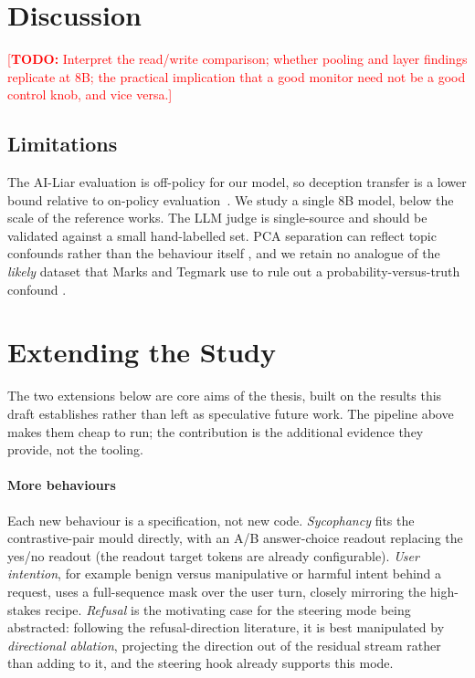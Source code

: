 \documentclass[conference]{IEEEtran}
\newcommand{\TODO}[1]{\textcolor{red}{[\textbf{TODO:} #1]}}
\begin{document}
\section{Discussion}
\TODO{Interpret the read/write comparison; whether pooling and layer findings
replicate at 8B; the practical implication that a good monitor need not be a
good control knob, and vice versa.}

\subsection{Limitations}
The AI-Liar evaluation is off-policy for our model, so deception transfer is a
lower bound relative to on-policy evaluation~\cite{goldowsky2025}. We study a
single 8B model, below the scale of the reference works. The LLM judge is
single-source and should be validated against a small hand-labelled set. PCA
separation can reflect topic confounds rather than the behaviour itself
\cite{goldowsky2025}, and we retain no analogue of the \emph{likely} dataset
that Marks and Tegmark use to rule out a probability-versus-truth confound
\cite{marks2024}.

\section{Extending the Study}
The two extensions below are core aims of the thesis, built on the results this
draft establishes rather than left as speculative future work. The pipeline
above makes them cheap to run; the contribution is the additional evidence they
provide, not the tooling.

\paragraph{More behaviours}
Each new behaviour is a specification, not new code.
\emph{Sycophancy} fits the contrastive-pair mould directly, with an A/B
answer-choice readout replacing the yes/no readout (the readout target tokens
are already configurable). \emph{User intention}, for example benign versus
manipulative or harmful intent behind a request, uses a full-sequence mask over
the user turn, closely mirroring the high-stakes recipe. \emph{Refusal} is the
motivating case for the steering mode being abstracted: following the
refusal-direction literature, it is best manipulated by \emph{directional
ablation}, projecting the direction out of the residual stream rather than
adding to it, and the steering hook already supports this mode.
\end{document}
